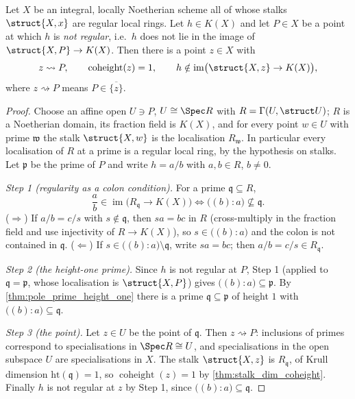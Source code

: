 \begin{theorem}
  \label{thm:pole_purity}
  \leanok
  Let \(X\) be an integral, locally Noetherian scheme all of whose stalks
  \(\struct{X,x}\) are regular local rings. Let \(h \in K(X)\) and let
  \(P \in X\) be a point at which \(h\) is \emph{not regular}, i.e.\ \(h\) does
  not lie in the image of \(\struct{X,P} \to K(X)\). Then there is a point
  \(z \in X\) with
  \[
    z \rightsquigarrow P, \qquad
    \operatorname{coheight}(z) = 1, \qquad
    h \notin \operatorname{im}\bigl(\struct{X,z} \to K(X)\bigr),
  \]
  where \(z \rightsquigarrow P\) means \(P \in \overline{\{z\}}\).
\end{theorem}
\begin{proof}
  \leanok
  Choose an affine open \(U \ni P\), \(U \cong \Spec R\) with
  \(R = \Gamma(U, \struct U)\); \(R\) is a Noetherian domain, its fraction field
  is \(K(X)\), and for every point \(w \in U\) with prime \(\mathfrak w\) the
  stalk \(\struct{X,w}\) is the localisation \(R_{\mathfrak w}\). In particular
  every localisation of \(R\) at a prime is a regular local ring, by the
  hypothesis on stalks. Let \(\mathfrak p\) be the prime of \(P\) and write
  \(h = a/b\) with \(a, b \in R\), \(b \neq 0\).

  \emph{Step 1 (regularity as a colon condition).} For a prime
  \(\mathfrak q \subseteq R\),
  \[
    \frac{a}{b} \in \operatorname{im}\bigl(R_{\mathfrak q} \to K(X)\bigr)
    \iff
    \bigl((b) : a\bigr) \not\subseteq \mathfrak q .
  \]
  (\(\Rightarrow\)) If \(a/b = c/s\) with \(s \notin \mathfrak q\), then
  \(s a = b c\) in \(R\) (cross-multiply in the fraction field and use
  injectivity of \(R \to K(X)\)), so \(s \in \bigl((b) : a\bigr)\) and the colon
  is not contained in \(\mathfrak q\). (\(\Leftarrow\)) If
  \(s \in \bigl((b) : a\bigr) \setminus \mathfrak q\), write \(s a = b c\); then
  \(a/b = c/s \in R_{\mathfrak q}\).

  \emph{Step 2 (the height-one prime).} Since \(h\) is not regular at \(P\),
  Step 1 (applied to \(\mathfrak q = \mathfrak p\), whose localisation is
  \(\struct{X,P}\)) gives \(\bigl((b) : a\bigr) \subseteq \mathfrak p\). By
  \ref{thm:pole_prime_height_one} there is a prime
  \(\mathfrak q \subseteq \mathfrak p\) of height \(1\) with
  \(\bigl((b) : a\bigr) \subseteq \mathfrak q\).

  \emph{Step 3 (the point).} Let \(z \in U\) be the point of \(\mathfrak q\).
  Then \(z \rightsquigarrow P\): inclusions of primes correspond to
  specialisations in \(\Spec R \cong U\), and specialisations in the open
  subspace \(U\) are specialisations in \(X\). The stalk \(\struct{X,z}\) is
  \(R_{\mathfrak q}\), of Krull dimension \(\mathrm{ht}(\mathfrak q) = 1\), so
  \(\operatorname{coheight}(z) = 1\) by \ref{thm:stalk_dim_coheight}. Finally
  \(h\) is not regular at \(z\) by Step 1, since
  \(\bigl((b) : a\bigr) \subseteq \mathfrak q\).
\end{proof}

